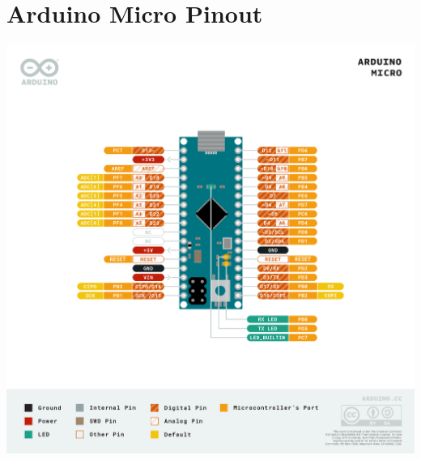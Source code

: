 
\chapter{Arduino Micro Pinout}\label{app:pinout}

\includegraphics[width=\textwidth]{graphics/appendix/arduino_pinout.png}

\clearpage